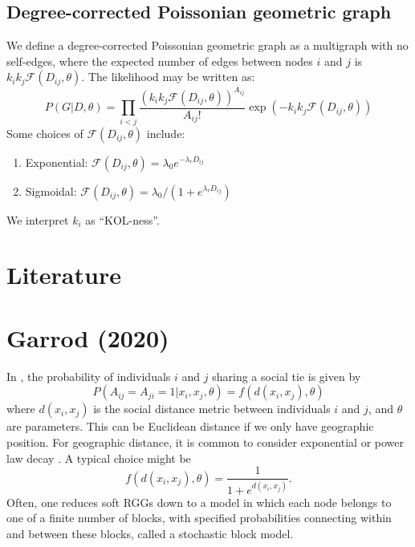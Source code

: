 \documentclass[11pt]{article}
\numberwithin{equation}{section}
\begin{document}
\subsection{Degree-corrected Poissonian geometric graph}
We define a degree-corrected Poissonian geometric graph as a multigraph with no self-edges, where the expected number of edges between nodes $i$ and $j$ is $k_i k_j \mathcal{F}(D_{ij}, \theta)$. The likelihood may be written as:
\begin{equation}
P(G|D, \theta) = \prod_{i<j} \frac{(k_i k_j \mathcal{F}(D_{ij}, \theta))^{A_{ij}}}{A_{ij}!} \exp(- k_i k_j \mathcal{F}(D_{ij}, \theta))
\end{equation}
\noindent Some choices of $\mathcal{F}(D_{ij}, \theta)$ include:
\begin{enumerate}
\item Exponential: $\mathcal{F}(D_{ij}, \theta) = \lambda_0 e^{-\lambda_r D_{ij}}$
\item Sigmoidal: $\mathcal{F}(D_{ij}, \theta) = \lambda_0/(1 + e^{\lambda_r D_{ij}})$
\end{enumerate}
We interpret $k_i$ as ``KOL-ness''.

\newpage



\section*{Literature}

\section{Garrod (2020)}
In \citep{Garrod20}, the probability of individuals $i$ and $j$ sharing a social tie is given by
\begin{equation}
P(A_{ij} = A_{ji} = 1| x_i, x_j, \theta) = f(d(x_i, x_j), \theta)
\end{equation}
where $d(x_i, x_j)$ is the social distance metric between individuals $i$ and $j$, and $\theta$ are parameters. This can be Euclidean distance if we only have geographic position. For geographic distance, it is common to consider exponential or power law decay \citep{Daraganova12}. A typical choice might be
\begin{equation}
f(d(x_i, x_j), \theta) = \frac{1}{1 + e^{d(x_i, x_j)}}.
\end{equation}
Often, one reduces soft RGGs down to a model in which each node belongs to one of a finite number of blocks, with specified probabilities connecting within and between these blocks, called a stochastic block model.
\end{document}
